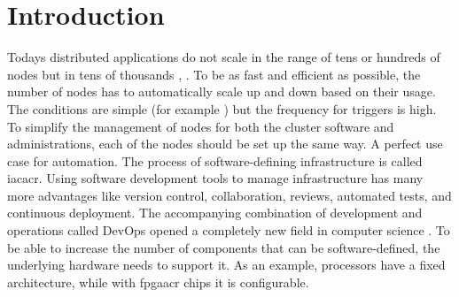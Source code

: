 

\chapter{Introduction}






Todays distributed applications do not scale in the range of tens or hundreds of nodes but in tens of thousands \cite{distributed_systems_concepts}, \cite{cluster_computing_whitepaper} \cite{kubernetes_15000_nodes}. To be as fast and efficient as possible, the number of nodes has to automatically scale up and down based on their usage. The conditions are simple (for example ) but the frequency for triggers is high. To simplify the management of nodes for both the cluster software and administrations, each of the nodes should be set up the same way. A perfect use case for automation.
\newline
The process of software-defining infrastructure is called \gls{iacacr}. Using software development tools to manage infrastructure has many more advantages like version control, collaboration, reviews, automated tests, and continuous deployment. The accompanying combination of development and operations called DevOps opened a completely new field in computer science \cite{bachelor_thesis}. To be able to increase the number of components that can be software-defined, the underlying hardware needs to support it. As an example, processors have a fixed architecture, while with \gls{fpgaacr} chips it is configurable.

